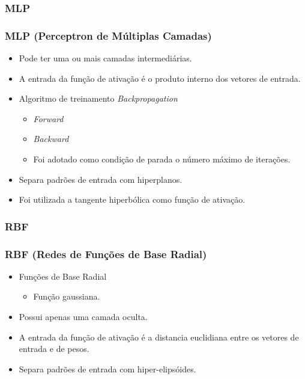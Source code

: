 \documentclass{beamer}
\begin{document}

\subsubsection{MLP}
\begin{frame}\frametitle{MLP (Perceptron de Múltiplas Camadas)}
	\begin{itemize}
		\item Pode ter uma ou mais camadas intermediárias.
		\item A entrada da função de ativação é o produto interno dos vetores de entrada.
		\item Algoritmo de treinamento \textit{Backpropagation}
			\begin{itemize}
				\item \textit{Forward}
				\item \textit{Backward}
				\item Foi adotado como condição de parada o número máximo de iterações.
			\end{itemize}
		\item Separa padrões de entrada com hiperplanos.
		\item Foi utilizada a tangente hiperbólica como função de ativação.
	\end{itemize}
\end{frame}



\subsubsection{RBF}
\begin{frame}\frametitle{RBF (Redes de Funções de Base Radial)}
	\begin{itemize}
	    \item Funções de Base Radial
	    	\begin{itemize}
	    		\item Função gaussiana.
	    	\end{itemize}
		\item Possui apenas uma camada oculta.
		\item A entrada da função de ativação é a distancia euclidiana entre os vetores de entrada e de pesos.
		\item Separa padrões de entrada com hiper-elipsóides.
	\end{itemize}
\end{frame}
\end{document}
